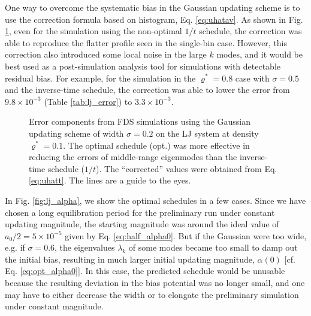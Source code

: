 \documentclass[reprint, superscriptaddress, floatfix]{revtex4-1}
\begin{document}
One way to overcome the systematic bias
in the Gaussian updating scheme
is to use the correction formula
based on histogram, Eq. \eqref{eq:uhatav}.
%
As shown in Fig. \ref{fig:lj_xerr},
even for the simulation using the non-optimal $1/t$ schedule,
the correction was able to reproduce
the flatter profile seen in the single-bin case.
%
However, this correction also introduced
some local noise in the large $k$ modes,
and it would be best used as a post-simulation
analysis tool for simulations
with detectable residual bias.
%
For example, for the simulation in the $\varrho^* = 0.8$ case
with $\sigma = 0.5$ and the inverse-time schedule,
the correction was able to lower
the error from $9.8\times10^{-3}$
(Table \ref{tab:lj_error}) to $3.3\times10^{-3}$.


\begin{figure}[h]
\begin{center}
  \caption{
    \label{fig:lj_xerr}
    Error components from FDS simulations
    using the Gaussian updating scheme
    of width $\sigma = 0.2$
    on the LJ system at density $\varrho^* = 0.1$.
    The optimal schedule (opt.) was more effective
    in reducing the errors of middle-range eigenmodes
    than the inverse-time schedule ($1/t$).
    The ``corrected'' values were obtained from
    Eq. \eqref{eq:uhatt}.
    The lines are a guide to the eyes.
  }
\end{center}
\end{figure}

In Fig. \ref{fig:lj_alpha},
we show the optimal schedules in a few cases.
%
%
Since we have chosen a long equilibration period
for the preliminary run under constant updating magnitude,
the starting magnitude was around
the ideal value of $a_0/2 = 5\times10^{-5}$
given by Eq. \eqref{eq:half_alpha0}.
%
But if the Gaussian were too wide,
e.g. if $\sigma = 0.6$,
the eigenvalues $\lambda_k$ of some modes
became too small to damp out the initial bias,
resulting in much larger initial updating magnitude, $\alpha(0)$
[cf. Eq. \eqref{eq:opt_alpha0}].
%
In this case, the predicted schedule
would be unusable because the resulting deviation in the bias potential
was no longer small,
and one may have to either decrease the width
or to elongate the preliminary simulation under constant magnitude.
\end{document}
